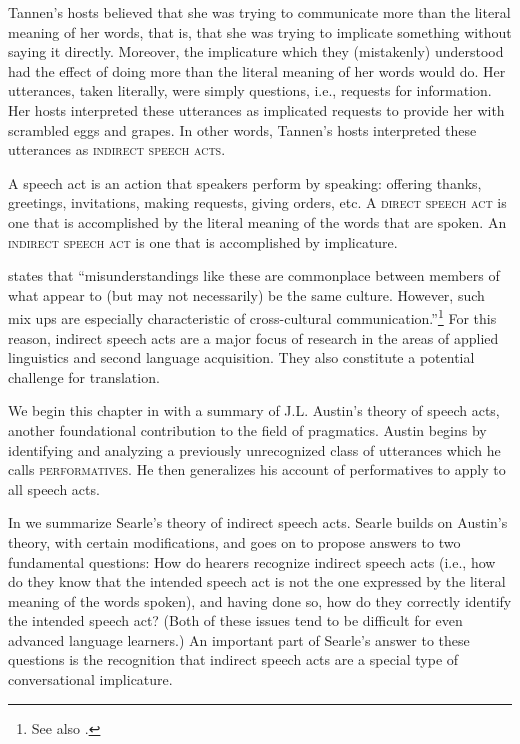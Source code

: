 Tannen’s hosts believed that she was trying to communicate more than the literal meaning of her words, that is, that she was trying to implicate something without saying it directly. Moreover, the implicature which they (mistakenly) understood had the effect of doing more than the literal meaning of her words would do. Her utterances, taken literally, were simply questions, i.e., requests for information. Her hosts interpreted these utterances as implicated requests to provide her with scrambled eggs and grapes. In other words, Tannen’s hosts interpreted these utterances as \textsc{indirect speech acts}.



A speech act is an action that speakers perform by speaking: offering thanks, greetings, invitations, making requests, giving orders, etc. A \textsc{direct speech act} is one that is accomplished by the literal meaning of the words that are spoken. An \textsc{indirect speech act} is one that is accomplished by implicature.



\citet{Tannen1981} states that “misunderstandings like these are commonplace between members of what appear to (but may not necessarily) be the same culture. However, such mix ups are especially characteristic of cross-cultural communication.”\footnote{See also \citet{Tannen1975,Tannen1986}.} For this reason, indirect speech acts are a major focus of research in the areas of applied linguistics and second language acquisition. They also constitute a potential challenge for translation.



We begin this chapter in  with a summary of J.L. Austin’s theory of speech acts, another foundational contribution to the field of pragmatics. Austin begins by identifying and analyzing a previously unrecognized class of utterances which he calls \textsc{performatives}. He then generalizes his account of performatives to apply to all speech acts.



In  we summarize Searle’s theory of indirect speech acts. Searle builds on Austin’s theory, with certain modifications, and goes on to propose answers to two fundamental questions: How do hearers recognize indirect speech acts (i.e., how do they know that the intended speech act is not the one expressed by the literal meaning of the words spoken), and having done so, how do they correctly identify the intended speech act? (Both of these issues tend to be difficult for even advanced language learners.) An important part of Searle’s answer to these questions is the recognition that indirect speech acts are a special type of conversational implicature.



